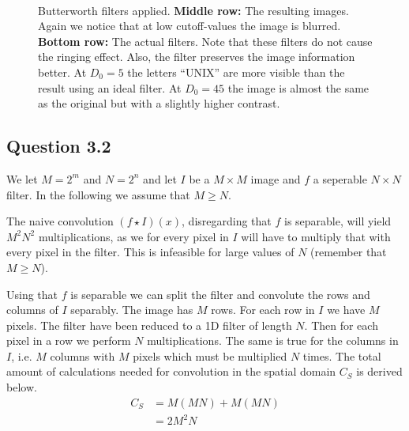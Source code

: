 \documentclass[a4paper, 10pt, final]{article}
\begin{document}
\begin{figure}[!h]
    \\
    \caption[]{Butterworth filters applied. \textbf{Middle row:} The
    resulting images. Again we notice that at low cutoff-values the
    image is blurred.
    \textbf{Bottom row:} The actual filters. Note that these filters do
    not cause the ringing effect. Also, the filter preserves the image
    information better. At $D_0 = 5$ the letters ``UNIX'' are more
    visible than the result using an ideal filter. At $D_0 = 45$ the
    image is almost the same as the original but with a slightly higher
    contrast.}
    \label{butter_unix}
\end{figure}

\clearpage

\subsection*{Question 3.2}
We let $M = 2^m$ and $N = 2^n$ and let $I$ be a $M \times M$ image and
$f$ a seperable $N \times N$ filter. In the following we assume that
$M \geq N$.

The naive convolution $(f \star I)(x)$, disregarding that $f$ is separable,
will yield $M^2N^2$ multiplications, as we for every pixel in $I$ will
have to multiply that with every pixel in the filter. This is infeasible
for large values of $N$ (remember that $M \geq N$).

Using that $f$ is separable we can split the filter and convolute the
rows and columns of $I$ separably. The image has $M$ rows. For each row
in $I$ we have $M$ pixels. The filter have been reduced to a 1D filter
of length $N$. Then for each pixel in a row we perform $N$
multiplications. The same is true for the columns in $I$, i.e.  $M$
columns with $M$ pixels which must be multiplied $N$ times. The total
amount of calculations needed for convolution in the spatial domain
$C_S$ is derived below.
\begin{align}
    C_S & = M(MN) + M(MN)\\
    & = 2M^2N
\end{align}
\end{document}
